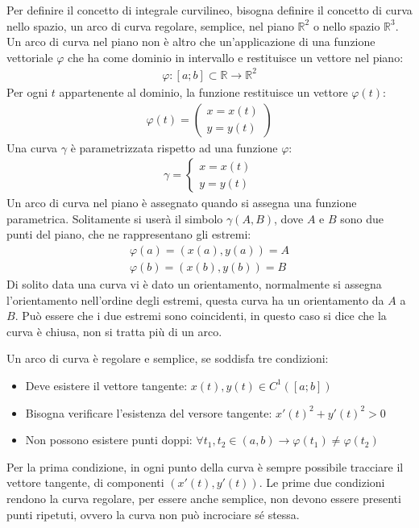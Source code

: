 \documentclass{article}
\numberwithin{equation}{subsection}
\begin{document}
Per definire il concetto di integrale curvilineo, bisogna definire il concetto di curva nello spazio, un arco di curva regolare, semplice, nel piano $\mathbb{R}^2$ o nello spazio $\mathbb{R}^3$. 
Un arco di curva nel piano non è altro che un'applicazione di una funzione vettoriale $\varphi$ che ha come dominio in intervallo e restituisce un vettore nel piano:
\begin{gather*}
    \varphi:[a;b]\subset\mathbb{R}\to\mathbb{R}^2
\end{gather*}
Per ogni $t$ appartenente al dominio, la funzione restituisce un vettore $\varphi(t)$:
\begin{gather*}
    \varphi(t)=\begin{pmatrix}
        x=x(t)\\
        y=y(t)
    \end{pmatrix}
\end{gather*}
Una curva $\gamma$ è parametrizzata rispetto ad una funzione $\varphi$:
\begin{gather*}
    \gamma=\begin{cases}
        x=x(t)\\y=y(t)
    \end{cases}
\end{gather*}
Un arco di curva nel piano è assegnato quando si assegna una funzione parametrica. 
Solitamente si userà il simbolo $\gamma(A,B)$, dove $A$ e $B$ sono due punti del piano, che ne rappresentano gli estremi: 
\begin{gather*}
    \varphi(a)=(x(a),y(a))=A\\
    \varphi(b)=(x(b),y(b))=B
\end{gather*}
Di solito data una curva vi è dato un orientamento, normalmente si assegna l'orientamento nell'ordine degli estremi, questa curva ha un orientamento da $A$ a $B$. Può essere che i due estremi sono coincidenti, in questo caso si dice che la curva è chiusa, non si tratta più di un arco. 

Un arco di curva è regolare e semplice, se soddisfa tre condizioni:
\begin{itemize}
    \item Deve esistere il vettore tangente: $x(t),y(t)\in C^1([a;b])$
    \item Bisogna verificare l'esistenza del versore tangente: $x'(t)^2+y'(t)^2>0$
    \item Non possono esistere punti doppi: $\forall t_1,t_2\in(a,b)\to \varphi(t_1)\neq\varphi(t_2)$
\end{itemize}
Per la prima condizione, in ogni punto della curva è sempre possibile tracciare il vettore tangente, di componenti $(x'(t),y'(t))$. 
Le prime due condizioni rendono la curva regolare, per essere anche semplice, non devono essere presenti punti ripetuti, ovvero la curva non può incrociare sé stessa. 
\end{document}
